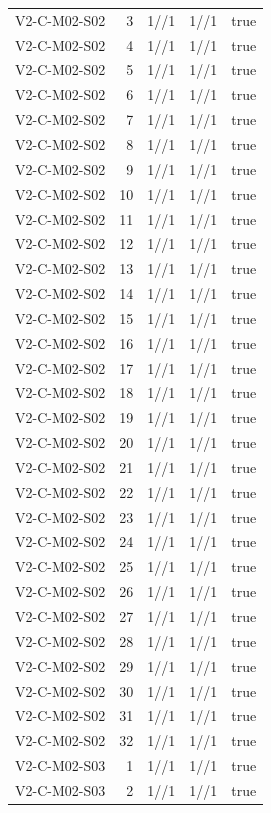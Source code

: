 {\begin{longtable}{lrrrr}
V2-C-M02-S02 & 3 & 1//1 & 1//1 & true \\
V2-C-M02-S02 & 4 & 1//1 & 1//1 & true \\
V2-C-M02-S02 & 5 & 1//1 & 1//1 & true \\
V2-C-M02-S02 & 6 & 1//1 & 1//1 & true \\
V2-C-M02-S02 & 7 & 1//1 & 1//1 & true \\
V2-C-M02-S02 & 8 & 1//1 & 1//1 & true \\
V2-C-M02-S02 & 9 & 1//1 & 1//1 & true \\
V2-C-M02-S02 & 10 & 1//1 & 1//1 & true \\
V2-C-M02-S02 & 11 & 1//1 & 1//1 & true \\
V2-C-M02-S02 & 12 & 1//1 & 1//1 & true \\
V2-C-M02-S02 & 13 & 1//1 & 1//1 & true \\
V2-C-M02-S02 & 14 & 1//1 & 1//1 & true \\
V2-C-M02-S02 & 15 & 1//1 & 1//1 & true \\
V2-C-M02-S02 & 16 & 1//1 & 1//1 & true \\
V2-C-M02-S02 & 17 & 1//1 & 1//1 & true \\
V2-C-M02-S02 & 18 & 1//1 & 1//1 & true \\
V2-C-M02-S02 & 19 & 1//1 & 1//1 & true \\
V2-C-M02-S02 & 20 & 1//1 & 1//1 & true \\
V2-C-M02-S02 & 21 & 1//1 & 1//1 & true \\
V2-C-M02-S02 & 22 & 1//1 & 1//1 & true \\
V2-C-M02-S02 & 23 & 1//1 & 1//1 & true \\
V2-C-M02-S02 & 24 & 1//1 & 1//1 & true \\
V2-C-M02-S02 & 25 & 1//1 & 1//1 & true \\
V2-C-M02-S02 & 26 & 1//1 & 1//1 & true \\
V2-C-M02-S02 & 27 & 1//1 & 1//1 & true \\
V2-C-M02-S02 & 28 & 1//1 & 1//1 & true \\
V2-C-M02-S02 & 29 & 1//1 & 1//1 & true \\
V2-C-M02-S02 & 30 & 1//1 & 1//1 & true \\
V2-C-M02-S02 & 31 & 1//1 & 1//1 & true \\
V2-C-M02-S02 & 32 & 1//1 & 1//1 & true \\
V2-C-M02-S03 & 1 & 1//1 & 1//1 & true \\
V2-C-M02-S03 & 2 & 1//1 & 1//1 & true \\

\end{longtable}}
